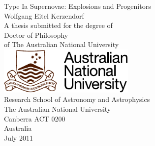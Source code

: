 \documentclass[11pt,openright]{report}
\makeatletter
\newcommand{\thesistitle}{Type Ia Supernovae: Explosions and Progenitors}
\newcommand{\fullname}{Wolfgang Eitel Kerzendorf}
\def\cleardoublepage{\clearpage\if@twoside \ifodd\c@page\else
	\hbox{}
	\vspace*{\fill}
	\thispagestyle{empty}
	\newpage
	\if@twocolumn\hbox{}\newpage\fi\fi\fi}
\makeatother
\begin{document}
\pagestyle{empty}

%
%
%
%
\begin{titlepage}\selectfont
  \begin{center}
    \LARGE{\thesistitle}
    \\[2cm]
    \Large{\fullname}
    \\[2cm]
    \normalsize{A thesis submitted for the degree of\\[0.5cm]
      Doctor of Philosophy\\[0.5cm]
      of The Australian National University}
    \\[1.5cm]
    \includegraphics[width=0.5\textwidth]{anu-logo-colour}
    \\[1.5cm]
    \large{Research School of Astronomy and Astrophysics \\[0.25cm]
      The Australian National University \\[0.25cm]
      Canberra ACT 0200 \\[0.25cm]
      Australia}
    \\[2cm]
    \textsf{July 2011}
  \end{center}
\end{titlepage}

%
%
%

%
%
\pagestyle{plain}
\setlength{\parindent}{0pt}
\setlength{\parskip}{1ex plus 0.5ex minus 0.2ex}
%

%

%

%
\tableofcontents\cleardoublepage
\listoffigures\cleardoublepage
\listoftables\cleardoublepage
\end{document}
